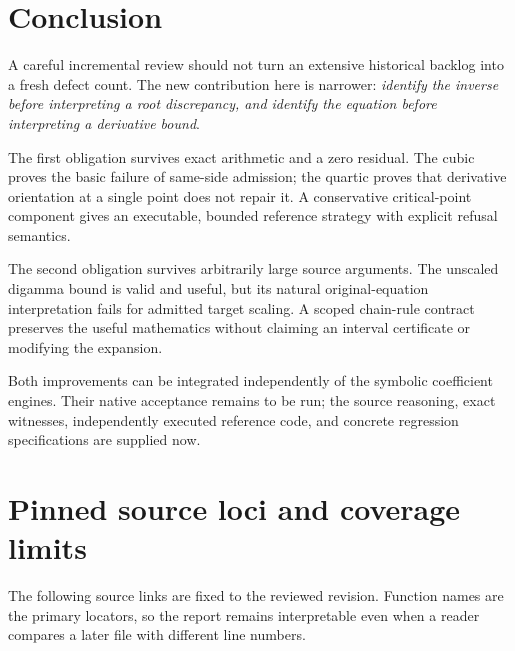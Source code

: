 \documentclass[11pt,letterpaper]{article}
\begin{document}
\section{Conclusion}

A careful incremental review should not turn an extensive historical backlog into a fresh defect count. The new contribution here is narrower: \emph{identify the inverse before interpreting a root discrepancy, and identify the equation before interpreting a derivative bound}.

The first obligation survives exact arithmetic and a zero residual. The cubic proves the basic failure of same-side admission; the quartic proves that derivative orientation at a single point does not repair it. A conservative critical-point component gives an executable, bounded reference strategy with explicit refusal semantics.

The second obligation survives arbitrarily large source arguments. The unscaled digamma bound is valid and useful, but its natural original-equation interpretation fails for admitted target scaling. A scoped chain-rule contract preserves the useful mathematics without claiming an interval certificate or modifying the expansion.

Both improvements can be integrated independently of the symbolic coefficient engines. Their native acceptance remains to be run; the source reasoning, exact witnesses, independently executed reference code, and concrete regression specifications are supplied now.

\appendix
\section{Pinned source loci and coverage limits}

The following source links are fixed to the reviewed revision. Function names are the primary locators, so the report remains interpretable even when a reader compares a later file with different line numbers.
\end{document}
